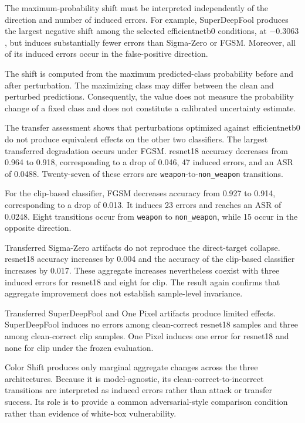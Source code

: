 The maximum-probability shift must be interpreted independently of the
direction and number of induced errors. For example, SuperDeepFool produces the
largest negative shift among the selected \gls{efficientnetb0} conditions, at
\(-0.3063\), but induces substantially fewer errors than Sigma-Zero or FGSM.
Moreover, all of its induced errors occur in the false-positive direction.

The shift is computed from the maximum predicted-class probability before and
after perturbation. The maximizing class may differ between the clean and
perturbed predictions. Consequently, the value does not measure the probability
change of a fixed class and does not constitute a calibrated uncertainty
estimate.

The transfer assessment shows that perturbations optimized against
\gls{efficientnetb0} do not produce equivalent effects on the other two
classifiers. The largest transferred degradation occurs under FGSM.
\gls{resnet18} accuracy decreases from 0.964 to 0.918, corresponding to a drop of
0.046, 47 induced errors, and an ASR of 0.0488. Twenty-seven of these errors are
\texttt{weapon}-to-\texttt{non\_weapon} transitions.

For the \gls{clip}-based classifier, FGSM decreases accuracy from 0.927 to 0.914,
corresponding to a drop of 0.013. It induces 23 errors and reaches an ASR of
0.0248. Eight transitions occur from \texttt{weapon} to
\texttt{non\_weapon}, while 15 occur in the opposite direction.

Transferred Sigma-Zero artifacts do not reproduce the direct-target collapse.
\gls{resnet18} accuracy increases by 0.004 and the accuracy of the \gls{clip}-based classifier
increases by 0.017. These aggregate increases nevertheless coexist with three
induced errors for \gls{resnet18} and eight for \gls{clip}. The result again confirms
that aggregate improvement does not establish sample-level invariance.

Transferred SuperDeepFool and One Pixel artifacts produce limited effects.
SuperDeepFool induces no errors among clean-correct \gls{resnet18} samples and three
among clean-correct \gls{clip} samples. One Pixel induces one error for
\gls{resnet18} and none for \gls{clip} under the frozen evaluation.

Color Shift produces only marginal aggregate changes across the three
architectures. Because it is model-agnostic, its clean-correct-to-incorrect
transitions are interpreted as induced errors rather than attack or transfer
success. Its role is to provide a common adversarial-style comparison condition
rather than evidence of white-box vulnerability.

